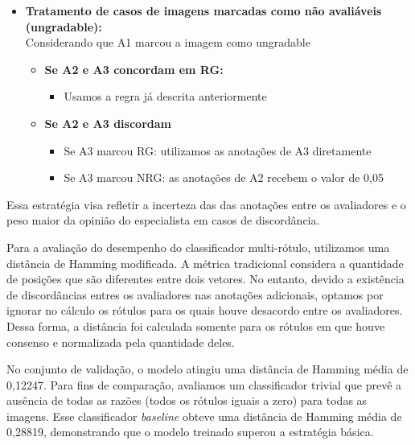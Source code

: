 \documentclass[12pt]{article}
\begin{document}
\begin{itemize}[noitemsep]
    \item \textbf{Tratamento de casos de imagens marcadas como não avaliáveis (ungradable):}\\
    Considerando que A1 marcou a imagem como ungradable
    \begin{itemize}[noitemsep]
        \item \textbf{Se A2 e A3 concordam em RG:}
        \begin{itemize}[noitemsep]
            \item Usamos a regra já descrita anteriormente
        \end{itemize}
        
        \item \textbf{Se A2 e A3 discordam}
        \begin{itemize}[noitemsep]
            \item Se A3 marcou RG: utilizamos as anotações de A3 diretamente
            \item Se A3 marcou NRG: as anotações de A2 recebem o valor de 0,05
        \end{itemize}
    \end{itemize}
    
\end{itemize}

Essa estratégia visa refletir a incerteza das das anotações entre os avaliadores e o peso maior da opinião do especialista em casos de discordância.

Para a avaliação do desempenho do classificador multi-rótulo, utilizamos uma distância de Hamming modificada. A métrica tradicional considera a quantidade de posições que são diferentes entre dois vetores. No entanto, devido a existência de discordâncias entres os avaliadores nas anotações adicionais, optamos por ignorar no cálculo os rótulos para os quais houve desacordo entre os avaliadores. Dessa forma, a distância foi calculada somente para os rótulos em que houve consenso e normalizada pela quantidade deles. 


No conjunto de validação, o modelo atingiu uma distância de Hamming média de 0,12247. Para fins de comparação, avaliamos um classificador trivial que prevê a ausência de todas as razões (todos os rótulos iguais a zero) para todas as imagens. Esse classificador \textit{baseline} obteve uma distância de Hamming média de 0,28819, demonstrando que o modelo treinado superou a estratégia básica.
\end{document}
